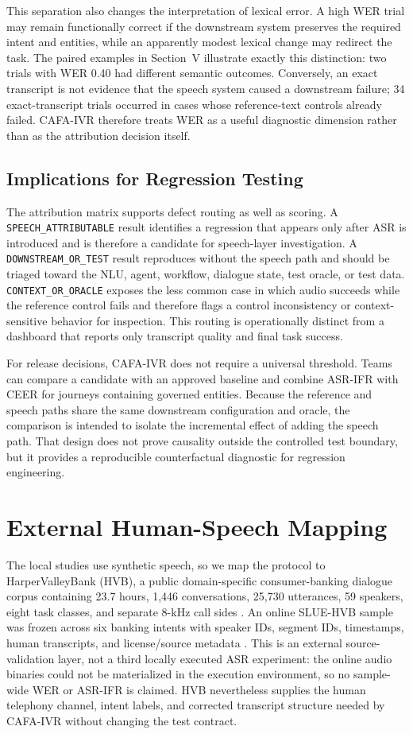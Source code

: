 \documentclass[9pt,twocolumn]{extarticle}
\begin{document}
This separation also changes the interpretation of lexical error. A high WER trial may remain functionally correct if the downstream system preserves the required intent and entities, while an apparently modest lexical change may redirect the task. The paired examples in Section~V illustrate exactly this distinction: two trials with WER 0.40 had different semantic outcomes. Conversely, an exact transcript is not evidence that the speech system caused a downstream failure; 34 exact-transcript trials occurred in cases whose reference-text controls already failed. CAFA-IVR therefore treats WER as a useful diagnostic dimension rather than as the attribution decision itself.

\subsection{Implications for Regression Testing}
The attribution matrix supports defect routing as well as scoring. A \texttt{SPEECH\_ATTRIBUTABLE} result identifies a regression that appears only after ASR is introduced and is therefore a candidate for speech-layer investigation. A \texttt{DOWNSTREAM\_OR\_TEST} result reproduces without the speech path and should be triaged toward the NLU, agent, workflow, dialogue state, test oracle, or test data. \texttt{CONTEXT\_OR\_ORACLE} exposes the less common case in which audio succeeds while the reference control fails and therefore flags a control inconsistency or context-sensitive behavior for inspection. This routing is operationally distinct from a dashboard that reports only transcript quality and final task success.

For release decisions, CAFA-IVR does not require a universal threshold. Teams can compare a candidate with an approved baseline and combine ASR-IFR with CEER for journeys containing governed entities. Because the reference and speech paths share the same downstream configuration and oracle, the comparison is intended to isolate the incremental effect of adding the speech path. That design does not prove causality outside the controlled test boundary, but it provides a reproducible counterfactual diagnostic for regression engineering.

\section{External Human-Speech Mapping}
The local studies use synthetic speech, so we map the protocol to HarperValleyBank (HVB), a public domain-specific consumer-banking dialogue corpus containing 23.7 hours, 1,446 conversations, 25,730 utterances, 59 speakers, eight task classes, and separate 8-kHz call sides \cite{wu2020hvb}. An online SLUE-HVB sample was frozen across six banking intents with speaker IDs, segment IDs, timestamps, human transcripts, and license/source metadata \cite{shon2022slue2}. This is an external source-validation layer, not a third locally executed ASR experiment: the online audio binaries could not be materialized in the execution environment, so no sample-wide WER or ASR-IFR is claimed. HVB nevertheless supplies the human telephony channel, intent labels, and corrected transcript structure needed by CAFA-IVR without changing the test contract.
\end{document}
